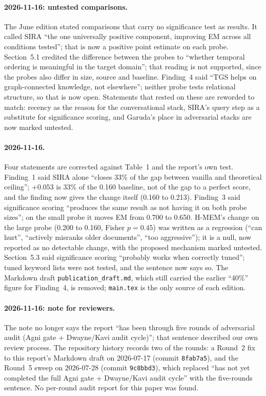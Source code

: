 \documentclass[11pt,a4paper]{article}
\begin{document}
\paragraph{2026-11-16: untested comparisons.} The June edition stated comparisons that carry no significance test as results. It called SIRA ``the one universally positive component, improving EM across all conditions tested''; that is now a positive point estimate on each probe. Section~5.1 credited the difference between the probes to ``whether temporal ordering is meaningful in the target domain''; that reading is not supported, since the probes also differ in size, source and baseline. Finding~4 said ``TGS helps on graph-connected knowledge, not elsewhere''; neither probe tests relational structure, so that is now open. Statements that rested on these are reworded to match: recency as the reason for the conversational stack, SIRA's query step as a substitute for significance scoring, and Garuda's place in adversarial stacks are now marked untested.

\paragraph{2026-11-16.} Four statements are corrected against Table~1 and the report's own test. Finding~1 said SIRA alone ``closes 33\% of the gap between vanilla and theoretical ceiling''; $+0.053$ is 33\% of the 0.160 baseline, not of the gap to a perfect score, and the finding now gives the change itself (0.160 to 0.213). Finding~3 said significance scoring ``produces the same result as not having it on both probe sizes''; on the small probe it moves EM from 0.700 to 0.650. H-MEM's change on the large probe (0.200 to 0.160, Fisher $p=0.45$) was written as a regression (``can hurt'', ``actively misranks older documents'', ``too aggressive''); it is a null, now reported as no detectable change, with the proposed mechanism marked untested. Section~5.3 said significance scoring ``probably works when correctly tuned''; tuned keyword lists were not tested, and the sentence now says so. The Markdown draft \texttt{publication\_draft.md}, which still carried the earlier ``40\%'' figure for Finding~4, is removed; \texttt{main.tex} is the only source of each edition.

\paragraph{2026-11-16: note for reviewers.} The note no longer says the report ``has been through five rounds of adversarial audit (Agni gate + Dwayne/Kavi audit cycle)''; that sentence described our own review process. The repository history records two of the rounds: a Round~2 fix to this report's Markdown draft on 2026-07-17 (commit \texttt{8fab7a5}), and the Round~5 sweep on 2026-07-28 (commit \texttt{9c8bbd3}), which replaced ``has not yet completed the full Agni gate + Dwayne/Kavi audit cycle'' with the five-rounds sentence. No per-round audit report for this paper was found.
\end{document}
